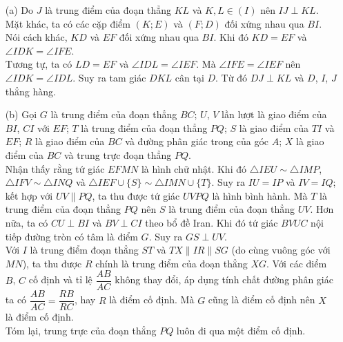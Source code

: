         \begin{solution}
            \hfill
            \begin{itemize}
                \item[(a)] Do \(J\) là trung điểm của đoạn thẳng \(KL\) và \(K, L \in (I)\) nên \(IJ \perp KL\).\\
                Mặt khác, ta có các cặp điểm \((K;E)\) và \((F;D)\) đối xứng nhau qua \(BI\). Nói cách khác, \(KD\) và \(EF\) đối xứng nhau qua \(BI\). Khi đó \(KD = EF\) và \(\angle IDK = \angle IFE\).\\
                Tương tự, ta có \(LD = EF\) và \(\angle IDL = \angle IEF\). Mà \(\angle IFE = \angle IEF\) nên \(\angle IDK = \angle IDL\). Suy ra tam giác \(DKL\) cân tại \(D\). Từ đó \(DJ \perp KL\) và \(D\), \(I\), \(J\) thẳng hàng.
                \item[(b)] Gọi \(G\) là trung điểm của đoạn thẳng \(BC\); \(U\), \(V\) lần lượt là giao điểm của \(BI\), \(CI\) với \(EF\); \(T\) là trung điểm của đoạn thẳng \(PQ\); \(S\) là giao điểm của \(TI\) và \(EF\); \(R\) là giao điểm của \(BC\) và đường phân giác trong của góc \(A\); \(X\) là giao điểm của \(BC\) và trung trực đoạn thẳng \(PQ\).\\
                Nhận thấy rằng tứ giác \(EFMN\) là hình chữ nhật. Khi đó \(\triangle IEU \sim \triangle IMP\), \(\triangle IFV \sim \triangle INQ\) và \(\triangle IEF \cup \{S\} \sim \triangle IMN \cup \{T\}\). Suy ra \(IU = IP\) và \(IV = IQ\); kết hợp với \(UV \parallel PQ\), ta thu được tứ giác \(UVPQ\) là hình bình hành. Mà \(T\) là trung điểm của đoạn thẳng \(PQ\) nên \(S\) là trung điểm của đoạn thẳng \(UV\). Hơn nữa, ta có \(CU \perp BI\) và \(BV \perp CI\) theo bổ đề Iran. Khi đó tứ giác \(BVUC\) nội tiếp đường tròn có tâm là điểm \(G\). Suy ra \(GS \perp UV\).\\
                Với \(I\) là trung điểm đoạn thẳng \(ST\) và \(TX \parallel IR \parallel SG\) (do cùng vuông góc với \(MN\)), ta thu được \(R\) chính là trung điểm của đoạn thẳng \(XG\). Với các điểm \(B\), \(C\) cố định và tỉ lệ \(\dfrac{AB}{AC}\) không thay đổi, áp dụng tính chất đường phân giác ta có \(\dfrac{AB}{AC} = \dfrac{RB}{RC}\), hay \(R\) là điểm cố định. Mà \(G\) cũng là điểm cố định nên \(X\) là điểm cố định.\\
                Tóm lại, trung trực của đoạn thẳng \(PQ\) luôn đi qua một điểm cố định.
            \end{itemize}
        \end{solution}
        
